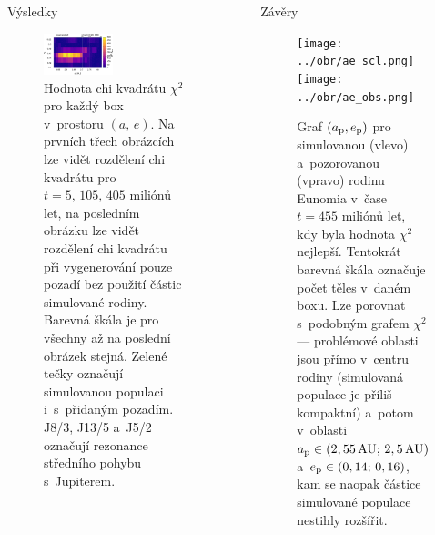 \documentclass{beamer}
\newlength{\sep}
\newlength{\vyskaB}
\newlength{\vyskaC}
\newlength{\side}
\newlength{\main}
\begin{document}
\begin{frame}
\begin{columns}[t]
\begin{column}{\main}
\begin{block}{Výsledky\phantom{Úy}}
\begin{minipage}[t][1.0\vyskaB][t]{\textwidth}
\begin{figure}
				\includegraphics[width=0.49\textwidth]{../obr/ae_chi_emptyt.png}
				\caption{Hodnota chi kvadrátu $\chi^2$ pro každý box v~prostoru $(a,\,e)$. Na prvních třech obrázcích lze vidět rozdělení chi kvadrátu pro $t=5,\,105,\,405$ miliónů let, na posledním obrázku lze vidět rozdělení chi kvadrátu při vygenerování pouze pozadí bez použití částic simulované rodiny. Barevná škála je pro všechny až na poslední obrázek stejná. Zelené tečky označují simulovanou populaci i~s~přidaným pozadím. J8/3, J13/5 a~J5/2 označují rezonance středního pohybu s~Jupiterem.} \label{fig:ae_chi2}
			\end{figure}

		\end{minipage}
	\end{block}
	\vspace{\sep}
\end{column}

\begin{column}{2\sep}
\end{column}

\begin{column}{\side}
	\begin{block}{Závěry\phantom{Úy}}
		\begin{minipage}[t][0.4\vyskaC][t]{\textwidth}
			\begin{figure}
			\centering
			\texttt{[image: ../obr/ae\_scl.png]}\\
			\texttt{[image: ../obr/ae\_obs.png]}\\
			\caption{Graf $(a_{\rm p}, e_{\rm p})$ pro simulovanou (vlevo) a~pozorovanou (vpravo) rodinu Eunomia v~čase $t=455$ miliónů let, kdy byla hodnota $\chi^2$ nejlepší. Tentokrát barevná škála označuje počet těles v~daném boxu. Lze porovnat s~podobným grafem $\chi^2$ --- problémové oblasti jsou přímo v~centru rodiny (simulovaná populace je příliš kompaktní) a~potom v~oblasti $a_{\rm p}\in(2,55\,{\rm AU};\,2,5\,{\rm AU})$ a~$e_{\rm p}\in(0,14;\,0,16)$, kam se naopak částice simulované populace nestihly rozšířit.} \label{fig:ae_obs_scl}
		\end{figure}


\end{minipage}
\end{block}
\end{column}
\end{columns}
\end{frame}
\end{document}
